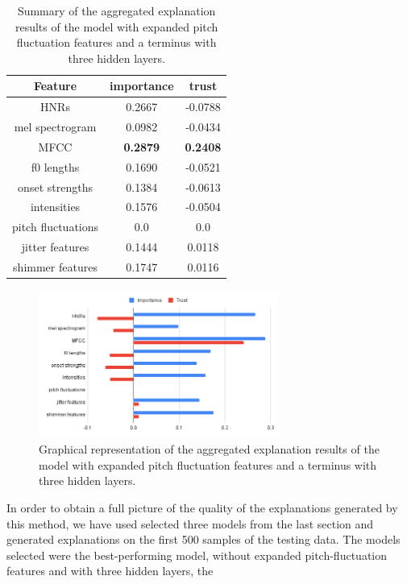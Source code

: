 \documentclass{article}
\begin{document}
		\begin{table}[htbp]
			\caption{Summary of the aggregated explanation results of the model with expanded
			pitch fluctuation features and a terminus with three hidden layers.}
			\vspace{10pt}
			\centering
			\begin{tabular}{c | c | c}
				\hline
				Feature & importance & trust \\
				\hline
				HNRs & 0.2667 & -0.0788 \\
				mel spectrogram & 0.0982 & -0.0434 \\
				MFCC & \textbf{0.2879} & \textbf{0.2408} \\
				f0 lengths & 0.1690 & -0.0521 \\
				onset strengths & 0.1384 & -0.0613 \\
				intensities & 0.1576 & -0.0504 \\
				pitch fluctuations & 0.0 & 0.0 \\
				jitter features & 0.1444 & 0.0118 \\
				shimmer features & 0.1747 & 0.0116
			\end{tabular}
			\label{table:exp-results-mpf-cterm}
		\end{table}
		\begin{figure}
			\centering
			\includegraphics[width=0.7\textwidth]{images/exp_mpf_cterm.png}
			\caption{Graphical representation of the aggregated explanation results of the model
			with expanded pitch fluctuation features and a terminus with three hidden layers.}
			\label{fig:exp_mpf_cterm}
		\end{figure}
		In order to obtain a full picture of the quality of the explanations generated by this
		method, we have used selected three models from the last section and generated explanations
		on the first 500 samples of the testing data. The models selected were the best-performing
		model, without expanded pitch-fluctuation features and with three hidden layers, the
\end{document}
